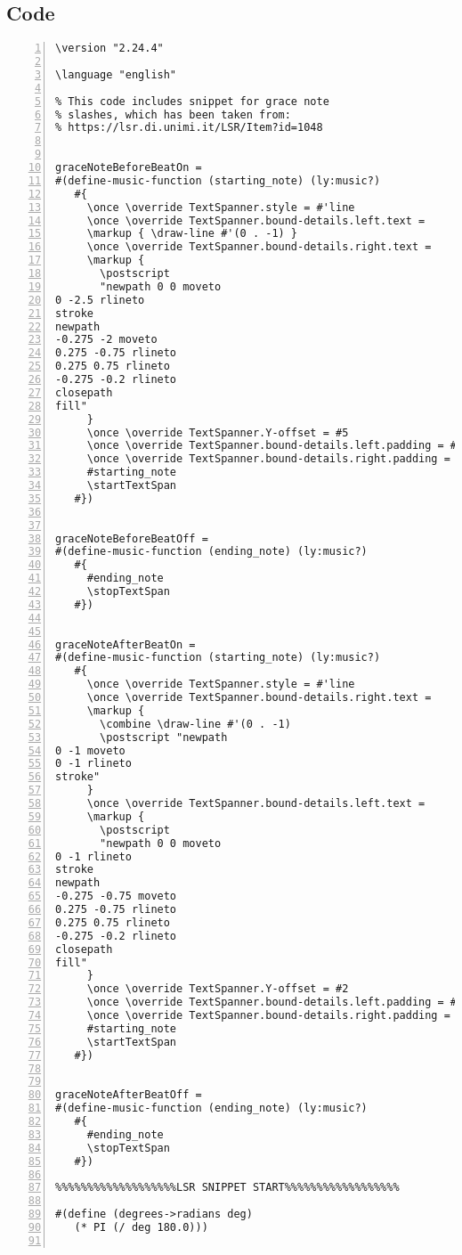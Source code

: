\subsection{Code}
\begin{Verbatim}[numbers=left,xleftmargin=5mm]
\version "2.24.4"

\language "english"

% This code includes snippet for grace note 
% slashes, which has been taken from:
% https://lsr.di.unimi.it/LSR/Item?id=1048


graceNoteBeforeBeatOn =
#(define-music-function (starting_note) (ly:music?)
   #{
     \once \override TextSpanner.style = #'line
     \once \override TextSpanner.bound-details.left.text =
     \markup { \draw-line #'(0 . -1) }
     \once \override TextSpanner.bound-details.right.text =
     \markup {
       \postscript
       "newpath 0 0 moveto 
0 -2.5 rlineto 
stroke 
newpath 
-0.275 -2 moveto 
0.275 -0.75 rlineto 
0.275 0.75 rlineto 
-0.275 -0.2 rlineto 
closepath 
fill"
     }
     \once \override TextSpanner.Y-offset = #5
     \once \override TextSpanner.bound-details.left.padding = #0.5
     \once \override TextSpanner.bound-details.right.padding = #-0.25
     #starting_note
     \startTextSpan
   #})


graceNoteBeforeBeatOff =
#(define-music-function (ending_note) (ly:music?)
   #{
     #ending_note
     \stopTextSpan
   #})


graceNoteAfterBeatOn =
#(define-music-function (starting_note) (ly:music?)
   #{
     \once \override TextSpanner.style = #'line
     \once \override TextSpanner.bound-details.right.text =
     \markup {
       \combine \draw-line #'(0 . -1)
       \postscript "newpath 
0 -1 moveto 
0 -1 rlineto 
stroke"
     }
     \once \override TextSpanner.bound-details.left.text =
     \markup {
       \postscript
       "newpath 0 0 moveto 
0 -1 rlineto 
stroke 
newpath 
-0.275 -0.75 moveto 
0.275 -0.75 rlineto 
0.275 0.75 rlineto 
-0.275 -0.2 rlineto 
closepath 
fill"
     }
     \once \override TextSpanner.Y-offset = #2
     \once \override TextSpanner.bound-details.left.padding = #0.5
     \once \override TextSpanner.bound-details.right.padding = #-0.25
     #starting_note
     \startTextSpan
   #})


graceNoteAfterBeatOff =
#(define-music-function (ending_note) (ly:music?)
   #{
     #ending_note
     \stopTextSpan
   #})

%%%%%%%%%%%%%%%%%%%LSR SNIPPET START%%%%%%%%%%%%%%%%%%

#(define (degrees->radians deg)
   (* PI (/ deg 180.0)))


\end{Verbatim}
